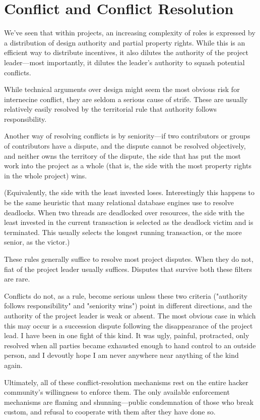 \section{Conflict and Conflict Resolution}

We've seen that within projects, an increasing complexity of roles is expressed
by a distribution of design authority and partial property rights.  While this
is an efficient way to distribute incentives, it also dilutes the authority of
the project leader—most importantly, it dilutes the leader's authority to squash
potential conflicts.

While technical arguments over design might seem the most obvious risk for
internecine conflict, they are seldom a serious cause of strife.  These are
usually relatively easily resolved by the territorial rule that authority
follows responsibility.

Another way of resolving conflicts is by seniority—if two contributors or groups
of contributors have a dispute, and the dispute cannot be resolved objectively,
and neither owns the territory of the dispute, the side that has put the most
work into the project as a whole (that is, the side with the most property
rights in the whole project) wins.

(Equivalently, the side with the least invested loses.  Interestingly this
happens to be the same heuristic that many relational database engines use to
resolve deadlocks.  When two threads are deadlocked over resources, the side
with the least invested in the current transaction is selected as the deadlock
victim and is terminated.  This usually selects the longest running transaction,
or the more senior, as the victor.)

These rules generally suffice to resolve most project disputes.  When they do
not, fiat of the project leader usually suffices.  Disputes that survive both
these filters are rare.

Conflicts do not, as a rule, become serious unless these two criteria
("authority follows responsibility" and "seniority wins") point in different
directions, and the authority of the project leader is weak or absent.  The most
obvious case in which this may occur is a succession dispute following the
disappearance of the project lead.  I have been in one fight of this kind.  It
was ugly, painful, protracted, only resolved when all parties became exhausted
enough to hand control to an outside person, and I devoutly hope I am never
anywhere near anything of the kind again.

Ultimately, all of these conflict-resolution mechanisms rest on the entire
hacker community's willingness to enforce them.  The only available enforcement
mechanisms are flaming and shunning—public condemnation of those who break
custom, and refusal to cooperate with them after they have done so.
